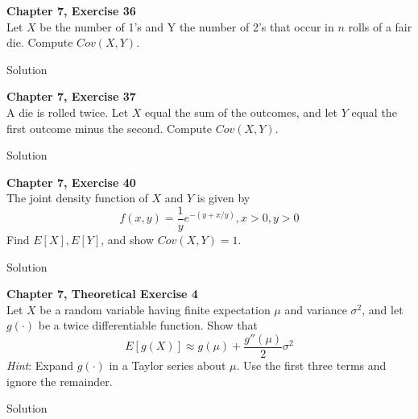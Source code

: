 \documentclass{article}
\begin{document}
\begin{spacing}{1.1}
\maketitle
\newpage
\begin{homeworkProblem}
  {\bf Chapter 7, Exercise 36}\\
  Let $X$ be the number of 1's and Y the number of 2's that occur in 
  $n$ rolls of a fair die. Compute $Cov( X, Y)$.
  \begin{homeworkSection}{Solution}
    
  \end{homeworkSection}
\end{homeworkProblem}

\newpage
\begin{homeworkProblem}
  {\bf Chapter 7, Exercise 37}\\
  A die is rolled twice. Let $X$ equal the sum of the outcomes, and 
  let $Y$ equal the first outcome minus the second. Compute $Cov(X, Y)$.
  \begin{homeworkSection}{Solution}
    
  \end{homeworkSection}
\end{homeworkProblem}

\newpage
\begin{homeworkProblem}
  {\bf Chapter 7, Exercise 40}\\
  The joint density function of $X$ and $Y$ is given by
    \[f( x, y) = \frac{ 1}{ y} e^{-(y + x / y)}, x > 0, y > 0\]
  Find $E[ X], E[ Y]$, and show $Cov( X, Y) = 1$.
  \begin{homeworkSection}{Solution}
    
  \end{homeworkSection}
\end{homeworkProblem}

\newpage
\begin{homeworkProblem}
  {\bf Chapter 7, Theoretical Exercise 4}\\
  Let $X$ be a random variable having finite expectation $\mu$ and 
  variance $\sigma^2$, and let $g(·)$ be a twice differentiable function. 
  Show that
  \[E[ g( X)] \approx g( \mu) + \frac{ g''(\mu)}{ 2} \sigma^2\]
  \emph{Hint}: Expand $g(·)$ in a Taylor series about $\mu$. Use the 
  first three terms and ignore the remainder.
  \begin{homeworkSection}{Solution}
    
  \end{homeworkSection}
\end{homeworkProblem}
  
\end{spacing}
\end{document}
